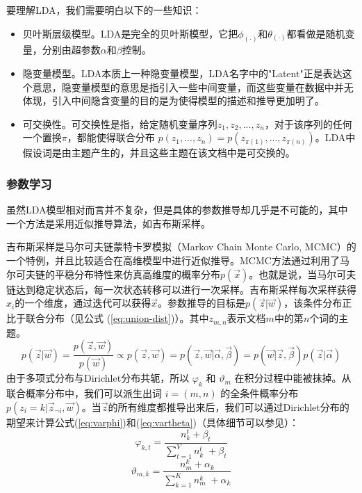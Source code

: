 要理解LDA，我们需要明白以下的一些知识：
\begin{itemize}
\item 贝叶斯层级模型。LDA是完全的贝叶斯模型，它把$\phi_{(\cdot)}$和$\theta_{(\cdot)}$都看做是随机变量，分别由超参数$\alpha$和$\beta$控制。
\item 隐变量模型。LDA本质上一种隐变量模型，LDA名字中的"Latent"正是表达这个意思，隐变量模型的意思是指引入一些中间变量，而这些变量在数据中并无体现，引入中间隐含变量的目的是为使得模型的描述和推导更加明了。
\item 可交换性。可交换性是指，给定随机变量序列${z_1, z_2, ... , z_n}$，对于该序列的任何一个置换$\pi$，都能使得联合分布 $p(z_1, ..., z_n)=p(z_{\pi(1)}, ..., z_{\pi(n)})$。LDA中假设词是由主题产生的，并且这些主题在该文档中是可交换的。
\end{itemize}

\subsubsection*{参数学习}
虽然LDA模型相对而言并不复杂，但是具体的参数推导却几乎是不可能的，其中一个方法是采用近似推导算法，如吉布斯采样\cite{griffiths2004finding}。\par
吉布斯采样是马尔可夫链蒙特卡罗模拟（Markov Chain Monte Carlo, MCMC）\cite{mackay2003information}的一个特例，并且比较适合在高维模型中进行近似推导。MCMC方法通过利用了马尔可夫链的平稳分布特性来仿真高维度的概率分布$p(\vec{x})$。也就是说，当马尔可夫链达到稳定状态后，每一次状态转移可以进行一次采样\cite{Walsh:2004}。吉布斯采样每次采样获得$x_i$的一个维度，通过迭代可以获得$\vec{x}$。参数推导的目标是$p(\vec{z}|\vec{w})$，该条件分布正比于联合分布（见公式 (\ref{eq:union-dist})）。其中$z_{m,n}$表示文档$m$中的第$n$个词的主题。
\begin{equation}
\label{eq:union-dist}
p(\vec{z}|\vec{w})=\frac{p(\vec{z}, \vec{w})}{p(\vec{w})} \propto p(\vec{z}, \vec{w}) = p(\vec{z}, \vec{w}|\vec{\alpha},\vec{\beta}) = p(\vec{w}|\vec{z},\vec{\beta})p(\vec{z}|\vec{\alpha})
\end{equation}
由于多项式分布与Dirichlet分布共轭，所以 $\varphi_k$ 和 $\vartheta_m$ 在积分过程中能被抹掉。从联合概率分布中，我们可以派生出词 $i=(m,n)$ 的全条件概率分布$p(z_i=k|\vec{z}_{\neg i},\vec{w})$。当$\vec{z}$的所有维度都推导出来后，我们可以通过Dirichlet分布的期望来计算公式(\ref{eq:varphi})和(\ref{eq:vartheta})（具体细节可以参见\cite{heinrich2005parameter}）：
\begin{equation}
\label{eq:varphi}
\varphi_{k,t}=\frac{n_{k}^{t}+\beta_{t}}{\sum_{t=1}^{V}n_{k}^{t} \; +\beta_{t}}
\end{equation} 
\begin{equation}
\label{eq:vartheta}
\vartheta_{m,k}=\frac{n_{m}^{k}+\alpha_k}{\sum_{k=1}^{K}n_{m}^{k} \; +\alpha_k}
\end{equation} 

